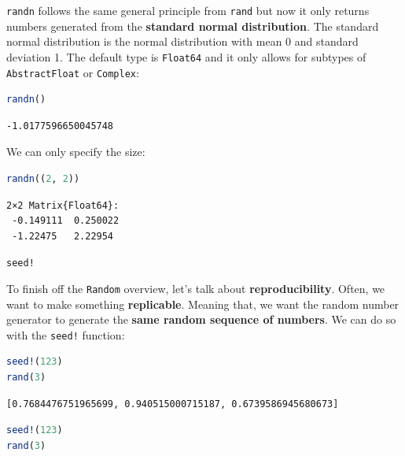 \documentclass[
  notoc %
]{tufte-book}
\makeatletter
\newcommand{\passthrough}[1]{#1}
\renewcommand\subsubsection{%
\@startsection{subsubsection}{3}{\z@ }{-3.25ex\@plus -1ex \@minus -.2ex}{1.5ex \@plus .2ex}{\normalfont \normalsize \bfseries }
}
\makeatother
\begin{document}
\passthrough{\lstinline!randn!} follows the same general principle from
\passthrough{\lstinline!rand!} but now it only returns numbers generated
from the \textbf{standard normal distribution}. The standard normal
distribution is the normal distribution with mean 0 and standard
deviation 1. The default type is \passthrough{\lstinline!Float64!} and
it only allows for subtypes of \passthrough{\lstinline!AbstractFloat!}
or \passthrough{\lstinline!Complex!}:

\begin{lstlisting}[language=Julia]
randn()
\end{lstlisting}

\begin{lstlisting}[language=Output]
-1.0177596650045748
\end{lstlisting}

We can only specify the size:

\begin{lstlisting}[language=Julia]
randn((2, 2))
\end{lstlisting}

\begin{lstlisting}[language=Output]
2×2 Matrix{Float64}:
 -0.149111  0.250022
 -1.22475   2.22954
\end{lstlisting}

\hypertarget{sec:random_seed}{%
\subsubsection{\texorpdfstring{\texttt{seed!}}{seed!}}\label{sec:random_seed}}

To finish off the \passthrough{\lstinline!Random!} overview, let's talk
about \textbf{reproducibility}. Often, we want to make something
\textbf{replicable}. Meaning that, we want the random number generator
to generate the \textbf{same random sequence of numbers}. We can do so
with the \passthrough{\lstinline"seed!"} function:

\begin{lstlisting}[language=Julia]
seed!(123)
rand(3)
\end{lstlisting}

\begin{lstlisting}[language=Output]
[0.7684476751965699, 0.940515000715187, 0.6739586945680673]
\end{lstlisting}

\begin{lstlisting}[language=Julia]
seed!(123)
rand(3)
\end{lstlisting}
\end{document}
